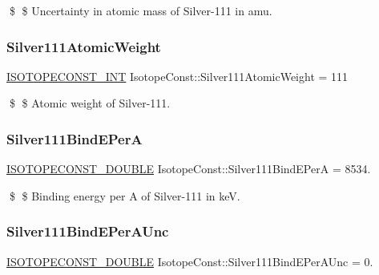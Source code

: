 \$ \$ Uncertainty in atomic mass of Silver-\/111 in amu. \mbox{\label{group___isotope_const-_silver-_ag111_ga689af1971da0e1836d56942f9e17af3f}} 
\subsubsection{\texorpdfstring{Silver111\+Atomic\+Weight}{Silver111AtomicWeight}}
{\footnotesize\ttfamily \mbox{\hyperlink{group___isotope_const-_macros_ga5f18360b3e99483a35c32d789e62621c}{I\+S\+O\+T\+O\+P\+E\+C\+O\+N\+S\+T\+\_\+\+I\+NT}} Isotope\+Const\+::\+Silver111\+Atomic\+Weight = 111}

\$ \$ Atomic weight of Silver-\/111. \mbox{\label{group___isotope_const-_silver-_ag111_ga2f665e29102d372da3249355908535ac}} 
\subsubsection{\texorpdfstring{Silver111\+Bind\+E\+PerA}{Silver111BindEPerA}}
{\footnotesize\ttfamily \mbox{\hyperlink{group___isotope_const-_macros_ga8f45a7272ce02c0b4c65c44636ed719a}{I\+S\+O\+T\+O\+P\+E\+C\+O\+N\+S\+T\+\_\+\+D\+O\+U\+B\+LE}} Isotope\+Const\+::\+Silver111\+Bind\+E\+PerA = 8534.}

\$ \$ Binding energy per A of Silver-\/111 in keV. \mbox{\label{group___isotope_const-_silver-_ag111_gadc800e6b8685f9da8c2d34f1d2601fef}} 
\subsubsection{\texorpdfstring{Silver111\+Bind\+E\+Per\+A\+Unc}{Silver111BindEPerAUnc}}
{\footnotesize\ttfamily \mbox{\hyperlink{group___isotope_const-_macros_ga8f45a7272ce02c0b4c65c44636ed719a}{I\+S\+O\+T\+O\+P\+E\+C\+O\+N\+S\+T\+\_\+\+D\+O\+U\+B\+LE}} Isotope\+Const\+::\+Silver111\+Bind\+E\+Per\+A\+Unc = 0.}

